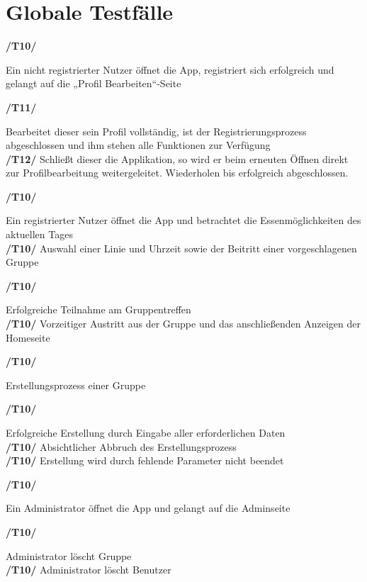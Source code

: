 \documentclass[a4paper]{scrreprt}
\begin{document}
\chapter{Globale Testfälle}

\begin{addmargin}[25pt]{0pt} 
\hypertarget{t10}{\textbf{/T10/}} Ein nicht registrierter Nutzer öffnet die App, registriert sich erfolgreich und gelangt auf die „Profil Bearbeiten“-Seite\\
  \begin{addmargin}[25pt]{0pt} 
  \hypertarget{t11}{\textbf{/T11/}} Bearbeitet dieser sein Profil vollständig, ist der Registrierungsprozess abgeschlossen und ihm stehen alle Funktionen zur Verfügung\\
  \hypertarget{t12}{\textbf{/T12/}} Schließt dieser die Applikation, so wird er beim erneuten Öffnen direkt zur Profilbearbeitung weitergeleitet. Wiederholen bis erfolgreich abgeschlossen.\\
  \end{addmargin}
\hypertarget{t20}{\textbf{/T10/}} Ein registrierter Nutzer öffnet die App und betrachtet die Essenmöglichkeiten des aktuellen Tages\\
\hypertarget{t30}{\textbf{/T10/}} Auswahl einer Linie und Uhrzeit sowie der Beitritt einer vorgeschlagenen Gruppe\\
  \begin{addmargin}[25pt]{0pt} 
  \hypertarget{t31}{\textbf{/T10/}} Erfolgreiche Teilnahme am Gruppentreffen\\
  \hypertarget{t32}{\textbf{/T10/}} Vorzeitiger Austritt aus der Gruppe und das anschließenden Anzeigen der Homeseite\\
  \end{addmargin}
\hypertarget{t40}{\textbf{/T10/}}  Erstellungsprozess einer Gruppe\\
  \begin{addmargin}[25pt]{0pt} 
  \hypertarget{t41}{\textbf{/T10/}} Erfolgreiche Erstellung durch Eingabe aller erforderlichen Daten\\
  \hypertarget{t42}{\textbf{/T10/}} Absichtlicher Abbruch des Erstellungsprozess\\
  \hypertarget{t43}{\textbf{/T10/}} Erstellung wird durch fehlende Parameter nicht beendet\\
  \end{addmargin}
\hypertarget{t50}{\textbf{/T10/}} Ein Administrator öffnet die App und gelangt auf die Adminseite\\
  \begin{addmargin}[25pt]{0pt} 
  \hypertarget{t10}{\textbf{/T10/}} Administrator löscht Gruppe\\
  \hypertarget{t10}{\textbf{/T10/}} Administrator löscht Benutzer\\
  \end{addmargin}



\end{addmargin}
\end{document}

